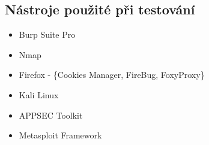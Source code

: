 \subsection{Nástroje použité při testování}
\begin{itemize}[noitemsep]
\item Burp Suite Pro
\item Nmap
\item Firefox - \{Cookies Manager, FireBug, FoxyProxy\}
\item Kali Linux
\item APPSEC Toolkit
\item Metasploit Framework
\end{itemize}

